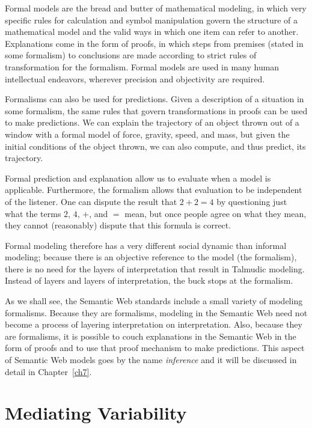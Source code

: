 Formal models are the bread and butter of mathematical modeling, in
which very specific rules for calculation and symbol manipulation govern
the structure of a mathematical model and the valid ways in which one
item can refer to another. Explanations come in the form of proofs, in
which steps from premises (stated in some formalism) to conclusions are
made according to strict rules of transformation for the formalism.
Formal models are used in many human intellectual endeavors, wherever
precision and objectivity are required.

Formalisms can also be used for predictions. Given a description of a
situation in some formalism, the same rules that govern transformations
in proofs can be used to make predictions. We can explain the trajectory
of an object thrown out of a window with a formal model of force,
gravity, speed, and mass, but given the initial conditions of the object
thrown, we can also compute, and thus predict, its trajectory.

Formal prediction and explanation allow us to evaluate when a model is
applicable. Furthermore, the formalism allows that evaluation to be
independent of the listener. One can dispute the result that 
$2 + 2 = 4$ by questioning just what the terms $2$, $4$, $+$, and
$=$ mean, but once people agree on what they mean, they cannot
(reasonably) dispute that this formula is correct.

Formal modeling therefore has a very different social dynamic than
informal modeling; because there is an objective reference to the model
(the formalism), there is no need for the layers of interpretation that
result in Talmudic modeling. Instead of layers and layers of
interpretation, the buck stops at the formalism.

As we shall see, the Semantic Web standards include a small variety of
modeling formalisms. Because they are formalisms, modeling in the
Semantic Web need not become a process of layering interpretation on
interpretation. Also, because they are formalisms, it is possible to
couch explanations in the Semantic
Web in the form of proofs and to use that proof mechanism to make
predictions. This aspect of Semantic
Web models goes by the name \emph{inference} and it will be discussed in
detail in Chapter~\ref{ch7}.

\section{Mediating Variability}

